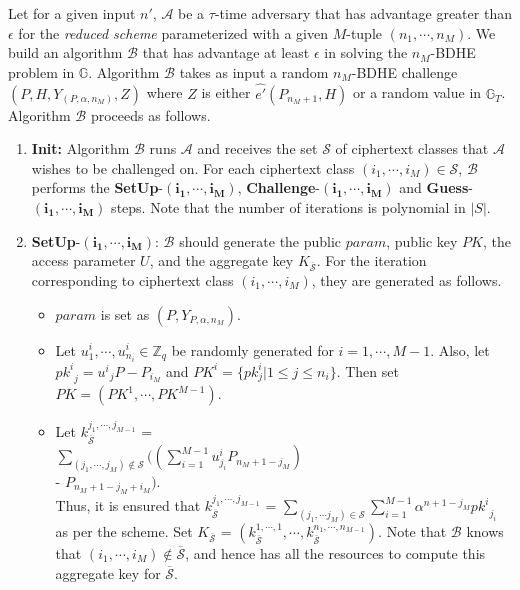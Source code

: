 \textbf{} Let for a given input $n'$, $\mathcal{A}$ be a $\tau$-time adversary that has advantage greater than $\epsilon$ for the \emph{reduced scheme} parameterized with a given $M$-tuple $(n_1,\cdots,n_M)$. We build an algorithm $\mathcal{B}$ that has advantage at least $\epsilon$ in solving the $n_M$-BDHE problem in $\mathbb{G}$. Algorithm $\mathcal{B}$ takes as input a random $n_M$-BDHE challenge $(P,H,Y_{(P,\alpha,n_M)},Z)$ where $Z$ is either $\hat{e'}(P_{n_M+1},H)$ or a random value in $\mathbb{G}_T$. Algorithm $\mathcal{B}$ proceeds as follows.

\begin{enumerate}
 \item \textbf{Init:} Algorithm $\mathcal{B}$ runs $\mathcal{A}$ and receives the set $\mathcal{S}$ of ciphertext classes that $\mathcal{A}$ wishes to be challenged on. For each ciphertext class $(i_1,\cdots,i_M)\in\mathcal{S}$, $\mathcal{B}$ performs the \textbf{SetUp}-$\mathbf{(i_1,\cdots,i_M)}$, \textbf{Challenge}-$\mathbf{(i_1,\cdots,i_M)}$ and \textbf{Guess}-$\mathbf{(i_1,\cdots,i_M)}$ steps. Note that the number of iterations is polynomial in $|S|$. 
 
 \item \textbf{SetUp}-$\mathbf{(i_1,\cdots,i_M)}$: $\mathcal{B}$ should generate the public $param$, public key $PK$, the access parameter $U$, and the aggregate key $K_{\overline{\mathcal{S}}}$. For the iteration corresponding to ciphertext class $(i_1,\cdots,i_M)$, they are generated as follows.
 \begin{itemize}
  \item $param$ is set as $(P,Y_{P,\alpha,n_M})$.
  \item Let $u^{i}_1,\cdots,u^{i}_{n_i} \in \mathbb{Z}_q$ be randomly generated for $i=1,\cdots,M-1$. Also, let ${pk^{i}}_j={u^{i}}_jP-P_{i_M}$ and $PK^{i}=\{pk^{i}_j|1\leq j \leq n_i\}$. Then set $PK=(PK^{1},\cdots,PK^{M-1})$.  
  \item Let $k^{j_1,\cdots,j_{M-1}}_{\overline{\mathcal{S}}}$ = \\$\sum_{(j_1,\cdots,j_M)\notin\mathcal{S}}((\sum_{i=1}^{M-1}u^{i}_{j_i}P_{n_M+1-j_M})$\\ - $P_{n_M+1-j_M+i_M})$.\\ Thus, it is ensured that $k^{j_1,\cdots,j_{M-1}}_{\overline{\mathcal{S}}}$ = $\sum_{(j_1,\cdots j_M)\in\mathcal{S}}\sum_{i=1}^{M-1}\alpha^{n+1-j_M}{pk^{i}}_{j_i}$ as per the scheme. Set $K_{\overline{\mathcal{S}}}$ = $(k^{1,\cdots,1}_{\overline{\mathcal{S}}},\cdots,k^{n_1,\cdots,n_{M-1}}_{\overline{\mathcal{S}}})$. Note that $\mathcal{B}$ knows that $(i_1,\cdots,i_M)\notin \overline{\mathcal{S}}$, and hence has all the resources to compute this aggregate key for $\overline{\mathcal{S}}$.  
  

\end{itemize}
\end{enumerate}
